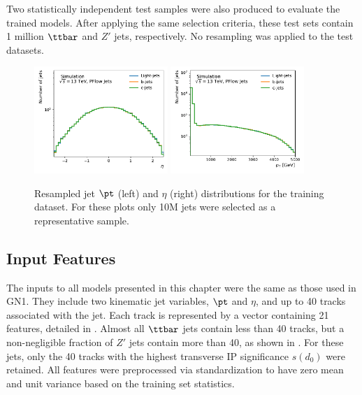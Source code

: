 Two statistically independent test samples were also produced to evaluate the trained models.
After applying the same selection criteria, these test sets contain 1 million $\ttbar$ and $Z'$ jets, respectively.
No resampling was applied to the test datasets.

\begin{figure}
    \centering
    \includegraphics[width=0.45\textwidth]{figures/flavour_tagging/train_0.pdf}
    \includegraphics[width=0.45\textwidth]{figures/flavour_tagging/train_1.pdf}
    \caption{Resampled jet $\pt$ (left) and $\eta$ (right) distributions for the training dataset. For these plots only 10M jets were selected as a representative sample.}
    \label{fig:train_jet_pt_eta}
\end{figure}

\subsection{Input Features}

The inputs to all models presented in this chapter were the same as those used in GN1.
They include two kinematic jet variables, $\pt$ and $\eta$, and up to 40 tracks associated with the jet.
Each track is represented by a vector containing 21 features, detailed in .
Almost all $\ttbar$ jets contain less than 40 tracks, but a non-negligible fraction of $Z'$ jets contain more than 40, as shown in .
For these jets, only the 40 tracks with the highest transverse IP significance $s(d_0)$ were retained.
All features were preprocessed via standardization to have zero mean and unit variance based on the training set statistics.

